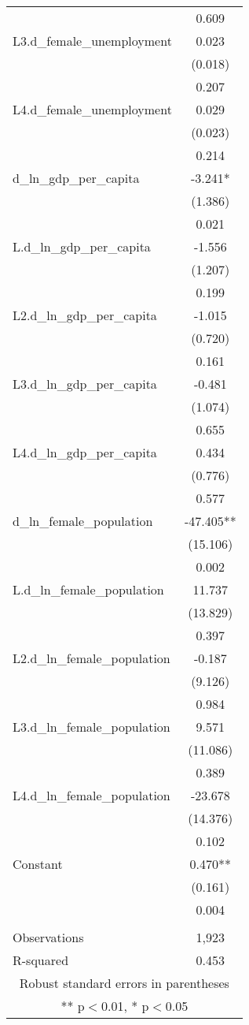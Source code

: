 \begin{tabular}{lc}
 & 0.609 \\
L3.d\_female\_unemployment & 0.023 \\
 & (0.018) \\
 & 0.207 \\
L4.d\_female\_unemployment & 0.029 \\
 & (0.023) \\
 & 0.214 \\
d\_ln\_gdp\_per\_capita & -3.241* \\
 & (1.386) \\
 & 0.021 \\
L.d\_ln\_gdp\_per\_capita & -1.556 \\
 & (1.207) \\
 & 0.199 \\
L2.d\_ln\_gdp\_per\_capita & -1.015 \\
 & (0.720) \\
 & 0.161 \\
L3.d\_ln\_gdp\_per\_capita & -0.481 \\
 & (1.074) \\
 & 0.655 \\
L4.d\_ln\_gdp\_per\_capita & 0.434 \\
 & (0.776) \\
 & 0.577 \\
d\_ln\_female\_population & -47.405** \\
 & (15.106) \\
 & 0.002 \\
L.d\_ln\_female\_population & 11.737 \\
 & (13.829) \\
 & 0.397 \\
L2.d\_ln\_female\_population & -0.187 \\
 & (9.126) \\
 & 0.984 \\
L3.d\_ln\_female\_population & 9.571 \\
 & (11.086) \\
 & 0.389 \\
L4.d\_ln\_female\_population & -23.678 \\
 & (14.376) \\
 & 0.102 \\
Constant & 0.470** \\
 & (0.161) \\
 & 0.004 \\
 &  \\
Observations & 1,923 \\
 R-squared & 0.453 \\ \hline
\multicolumn{2}{c}{ Robust standard errors in parentheses} \\
\multicolumn{2}{c}{ ** p$<$0.01, * p$<$0.05} \\
\end{tabular}
